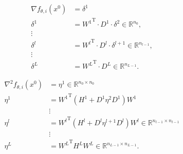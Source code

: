 \documentclass[9pt]{beamer}
\begin{document}
\begin{frame}
    \begin{equation*} 
        \begin{aligned}
            \nabla f_{\theta, i} \left(x^0\right) & = \delta^1 \\
            \delta^1 & = {W^{1}}^{\mathrm{T}} \cdot D^{1} \cdot \delta^2 \in \mathbb{R}^{n_0}, \\
            \vdots & \\
            \delta^l & = {W^{l}}^{\mathrm{T}} \cdot D^{l} \cdot \delta^{l+1} \in \mathbb{R}^{n_{l-1}}, \\
            \vdots & \\
            \delta^{L} & = {W^L}^{\mathrm{T}} \cdot D^{L} \in \mathbb{R}^{n_{L-1}}.
        \end{aligned} 
    \end{equation*} 
\end{frame}



\begin{frame}
    \begin{equation*}
        \begin{aligned}
            \nabla^{2} f_{\theta, i} \left(x^0\right) & = \eta^{1} \in \mathbb{R}^{n_0 \times n_0} \\
            \eta^{1} & = {W^{1}}^{\mathrm{T}} \left( H^{1} + D^{1} \eta^{2} D^{1} \right) W^{1} \\
            & \vdots \\
            \eta^{l} & = {W^{l}}^{\mathrm{T}} \left( H^{l} + D^{l} \eta^{l+1} D^{l} \right) W^{l} \in \mathbb{R}^{n_{l-1} \times n_{l-1}} \\
            & \vdots \\
            \eta^{L} & = {W^L}^{\mathrm{T}} H^{L} W^L \in \mathbb{R}^{n_{L-1} \times n_{L-1}}.
        \end{aligned}
    \end{equation*}
\end{frame}
\end{document}
